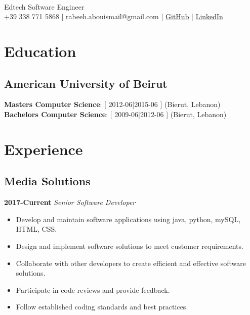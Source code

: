 \documentclass{article}
\author{Rabeeh Abou Ismail}
\makeatletter
\renewcommand{\maketitle} {
	    \begin{center}
    		{\huge\bfseries\theauthor} \\
    		{Edtech Software Engineer} \\
    		+39 338 771 5868 |
	    rabeeh.abouismail@gmail.com | 
	    \href{https://github.com/Rabeehai}{GitHub} | 
	    \href{https://www.linkedin.com/in/rabeeh-abou-ismael-1b569995/}{LinkedIn}
	    \vspace{.25em}
	    \end{center}
	}
\newcommand{\jobdate}[7]{
		\textbf{#1}: [ #2-#3|#4-#5 ] (#6, #7)
  	}
\makeatother
\begin{document}
\maketitle

\section{Education}
\subsection{American University of Beirut}
	\jobdate{Masters Computer Science}{2012}{06}{2015}{06}{Bierut}{Lebanon}\\
	\jobdate{Bachelors Computer Science}{2009}{06}{2012}{06}{Bierut}{Lebanon}
\section{Experience}
\subsection{Media Solutions}
    \textbf{2017-Current}
    \textit{Senior Software Developer}
    \begin{itemize}
	    \item Develop and maintain software applications using java, python, mySQL, HTML, CSS. 
	    \item Design and implement software solutions to meet customer requirements. 
	    \item Collaborate with other developers to create efficient and effective software solutions.
	    \item Participate in code reviews and provide feedback.
    		\item Follow established coding standards and best practices.
    \end{itemize}
    
\end{document}
